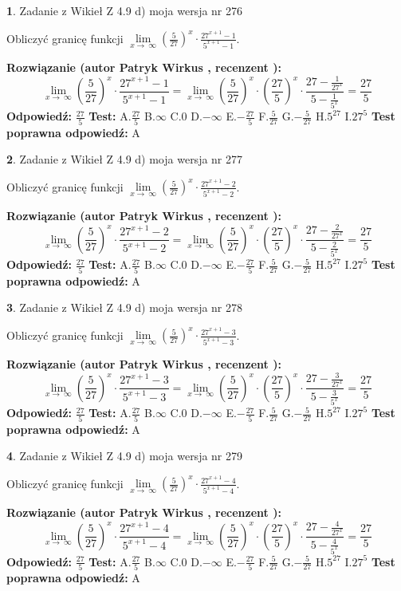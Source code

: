 \documentclass[12pt, a4paper]{article}
\theoremstyle{definition} %
\newtheorem{zad}{}
\newcommand{\zadStart}[1]{\begin{zad}#1\newline}
\newcommand{\zadStop}{\end{zad}}
\newcommand{\rozwStart}[2]{\noindent \textbf{Rozwiązanie (autor #1 , recenzent #2): }\newline}
\newcommand{\rozwStop}{\newline}
\newcommand{\odpStart}{\noindent \textbf{Odpowiedź:}\newline}
\newcommand{\odpStop}{\newline}
\newcommand{\testStart}{\noindent \textbf{Test:}\newline}
\newcommand{\testStop}{\newline}
\newcommand{\kluczStart}{\noindent \textbf{Test poprawna odpowiedź:}\newline}
\newcommand{\kluczStop}{\newline}
\begin{document}
\zadStart{Zadanie z Wikieł Z 4.9 d) moja wersja nr 276}


Obliczyć granicę funkcji  $\lim\limits_{x\to\ \infty}(\frac{5}{27})^{x}\cdot\frac{27^{x+1}-1}{5^{x+1}-1}$.
\zadStop
\rozwStart{Patryk Wirkus}{}
$$\lim\limits_{x\to\ \infty}(\frac{5}{27})^{x}\cdot\frac{27^{x+1}-1}{5^{x+1}-1}=\lim\limits_{x\to\ \infty}(\frac{5}{27})^{x}\cdot(\frac{27}{5})^{x} \cdot \frac{27-\frac{1}{27^{x}}}{5-\frac{1}{5^{x}}} = \frac{27}{5}$$
\rozwStop
\odpStart
$\frac{27}{5}$
\odpStop
\testStart
A.$\frac{27}{5}$ B.$\infty$ C.$0$ D.$-\infty$ E.$-\frac{27}{5}$
F.$\frac{5}{27}$ G.$-\frac{5}{27}$
H.$5^{27}$
I.$27^{5}$
\testStop
\kluczStart
A
\kluczStop



\zadStart{Zadanie z Wikieł Z 4.9 d) moja wersja nr 277}


Obliczyć granicę funkcji  $\lim\limits_{x\to\ \infty}(\frac{5}{27})^{x}\cdot\frac{27^{x+1}-2}{5^{x+1}-2}$.
\zadStop
\rozwStart{Patryk Wirkus}{}
$$\lim\limits_{x\to\ \infty}(\frac{5}{27})^{x}\cdot\frac{27^{x+1}-2}{5^{x+1}-2}=\lim\limits_{x\to\ \infty}(\frac{5}{27})^{x}\cdot(\frac{27}{5})^{x} \cdot \frac{27-\frac{2}{27^{x}}}{5-\frac{2}{5^{x}}} = \frac{27}{5}$$
\rozwStop
\odpStart
$\frac{27}{5}$
\odpStop
\testStart
A.$\frac{27}{5}$ B.$\infty$ C.$0$ D.$-\infty$ E.$-\frac{27}{5}$
F.$\frac{5}{27}$ G.$-\frac{5}{27}$
H.$5^{27}$
I.$27^{5}$
\testStop
\kluczStart
A
\kluczStop



\zadStart{Zadanie z Wikieł Z 4.9 d) moja wersja nr 278}


Obliczyć granicę funkcji  $\lim\limits_{x\to\ \infty}(\frac{5}{27})^{x}\cdot\frac{27^{x+1}-3}{5^{x+1}-3}$.
\zadStop
\rozwStart{Patryk Wirkus}{}
$$\lim\limits_{x\to\ \infty}(\frac{5}{27})^{x}\cdot\frac{27^{x+1}-3}{5^{x+1}-3}=\lim\limits_{x\to\ \infty}(\frac{5}{27})^{x}\cdot(\frac{27}{5})^{x} \cdot \frac{27-\frac{3}{27^{x}}}{5-\frac{3}{5^{x}}} = \frac{27}{5}$$
\rozwStop
\odpStart
$\frac{27}{5}$
\odpStop
\testStart
A.$\frac{27}{5}$ B.$\infty$ C.$0$ D.$-\infty$ E.$-\frac{27}{5}$
F.$\frac{5}{27}$ G.$-\frac{5}{27}$
H.$5^{27}$
I.$27^{5}$
\testStop
\kluczStart
A
\kluczStop



\zadStart{Zadanie z Wikieł Z 4.9 d) moja wersja nr 279}


Obliczyć granicę funkcji  $\lim\limits_{x\to\ \infty}(\frac{5}{27})^{x}\cdot\frac{27^{x+1}-4}{5^{x+1}-4}$.
\zadStop
\rozwStart{Patryk Wirkus}{}
$$\lim\limits_{x\to\ \infty}(\frac{5}{27})^{x}\cdot\frac{27^{x+1}-4}{5^{x+1}-4}=\lim\limits_{x\to\ \infty}(\frac{5}{27})^{x}\cdot(\frac{27}{5})^{x} \cdot \frac{27-\frac{4}{27^{x}}}{5-\frac{4}{5^{x}}} = \frac{27}{5}$$
\rozwStop
\odpStart
$\frac{27}{5}$
\odpStop
\testStart
A.$\frac{27}{5}$ B.$\infty$ C.$0$ D.$-\infty$ E.$-\frac{27}{5}$
F.$\frac{5}{27}$ G.$-\frac{5}{27}$
H.$5^{27}$
I.$27^{5}$
\testStop
\kluczStart
A
\kluczStop
\end{document}
